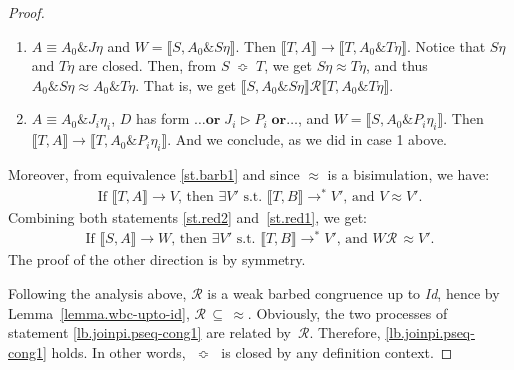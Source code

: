 \documentclass{LMCS}
\makeatletter
\newcommand{\Id}{\emph{Id}\@\xspace}
\newcommand{\kwd}[1]{\ensuremath{\mathbf{#1}}}
\renewcommand{\_}{\mathord{\rule[-.25ex]{1ex}{.15ex}}}
\newcommand{\C}[1]{\llbracket#1\rrbracket}
\newcommand{\para}[2]{#1\mathop{\&}#2}
\newcommand{\reaction}[2]{#1 \triangleright #2}
\newcommand{\reduces}{\longrightarrow}
\newcommand{\wbc}{\mathrel{\approx}}
\newcommand{\R}{\mathrel{\mathcal{R}}}
\newcommand{\pseq}{\;\mathop{\Bumpeq}\;}
\makeatother
\begin{document}
\begin{proof}
\begin{enumerate}[$\bullet$]
\begin{enumerate}[(1)]
    \item $A\equiv\para{A_0}{{J}{\eta}}$ and
    $W=\C{S,\para{A_0}{{S}{\eta}}}$. Then $\C{T,A} \reduces
    \C{T,\para{A_0}{{T}{\eta}}}$.
    Notice that ${S}{\eta}$ and ${T}{\eta}$ are
    closed. Then, from $S\pseq T$, we get ${S}{\eta} \wbc {T}{\eta}$,
    and thus  $\para{A_0}{{S}{\eta}} \wbc
    \para{A_0}{{T}{\eta}}$.  That is, we get $\C{S,\para{A_0}{{S}{\eta}}}
    \R \C{T,\para{A_0}{{T}{\eta}}}$.

    \item $A \equiv \para{A_0}{{J_i}{\eta_i}}$, $D$ has
    form $\ldots \kwd{or}\;\reaction{J_i}{P_i}\;\kwd{or}\ldots$, and $W
    =\C{S,\para{A_0}{{P_i}{\eta_i}}}$. Then $\C{T,A} \reduces
    \C{T,\para{A_0}{{P_i}{\eta_i}}}$. And we conclude,
     as we did in case 1 above.
\end{enumerate}\medskip

Moreover, from equivalence \eqref{st.barb1}
and since $\wbc$ is a bisimulation, we have:
    \begin{align}
      \label{st.red1}
      \mbox{If $\C{T,A}\reduces V$, then $\exists V'$ s.t. 
        $\C{T,B}\reduces^* V'$, and $V\wbc V'$.}
    \end{align}
    Combining both statements \eqref{st.red2} and~\eqref{st.red1},
    we get:
    \begin{align}
      \label{st.red}
      \mbox{If $\C{S,A}\reduces W$, then $\exists V'$ s.t.
        $\C{T,B}\reduces^* V'$, and $W \mathrel{\R\,\wbc} V'$.}
    \end{align}
    The proof of the other direction is by symmetry.
  \end{enumerate}

  Following the analysis above, $\R$ is a weak barbed congruence up to
  \Id, hence by Lemma~\ref{lemma.wbc-upto-id}, $\R\,\subseteq\,\wbc$.
  Obviously, the two processes of statement
  \eqref{lb.joinpi.pseq-cong1} are related by~$\R$. Therefore,
  \eqref{lb.joinpi.pseq-cong1} holds.  In other words, $\pseq$ is
  closed by any definition context.


\end{proof}
\end{document}
